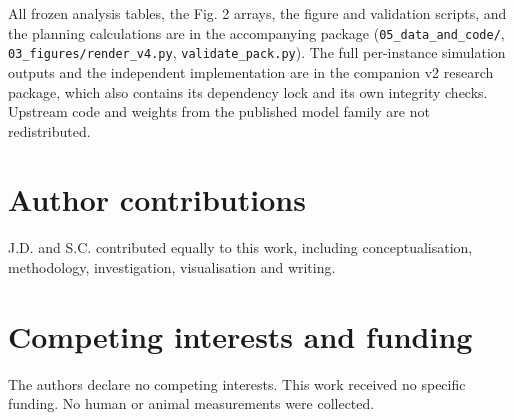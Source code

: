All frozen analysis tables, the Fig. 2 arrays, the figure and validation scripts, and the planning calculations are in the accompanying package (\texttt{05\_data\_and\_code/}, \texttt{03\_figures/render\_v4.py}, \texttt{validate\_pack.py}). The full per-instance simulation outputs and the independent implementation are in the companion v2 research package, which also contains its dependency lock and its own integrity checks. Upstream code and weights from the published model family are not redistributed.

\section{Author contributions}

J.D. and S.C. contributed equally to this work, including conceptualisation, methodology, investigation, visualisation and writing.

\section{Competing interests and funding}

The authors declare no competing interests. This work received no specific funding. No human or animal measurements were collected.

